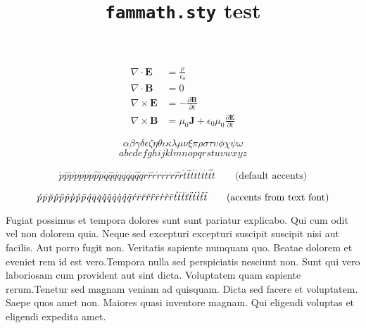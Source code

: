 \documentclass{article}
\title{\texttt{fammath.sty} test}
\date{}
\begin{document}
  \maketitle

  \begin{align*}
    \nabla\cdot\mathbf{E} &= \frac{\rho}{\epsilon_0}\\
    \nabla\cdot\mathbf{B} &= 0\\
    \nabla\times\mathbf{E} &= -\frac{\partial\mathbf{B}}{\partial{t}}\\
    \nabla\times\mathbf{B} &= \mu_0\mathbf{J} + \epsilon_0\mu_0\frac{\partial\mathbf{E}}{\partial{t}}
  \end{align*}

  \begin{equation}
    \alpha \beta \gamma \delta \epsilon \zeta \eta \theta \iota \kappa \lambda \mu \nu \xi \pi \rho \sigma \tau \upsilon \phi \chi \psi \omega
  \end{equation}
  \begin{equation}
    abcdefghijklmnopqrstuvwxyz
  \end{equation}

  \begin{equation}
  \acute{p}
  \bar{p}
  \breve{p}
  \check{p}
  \ddot{p}
  \dot{p}
  \grave{p}
  \hat{p}
  \tilde{p}
  \acute{q}
  \bar{q}
  \breve{q}
  \check{q}
  \ddot{q}
  \dot{q}
  \grave{q}
  \hat{q}
  \tilde{q}
  \acute{r}
  \bar{r}
  \breve{r}
  \check{r}
  \ddot{r}
  \dot{r}
  \grave{r}
  \hat{r}
  \tilde{r}
  \acute{t}
  \bar{t}
  \breve{t}
  \check{t}
  \ddot{t}
  \dot{t}
  \grave{t}
  \hat{t}
  \tilde{t}
  \qquad{\text{(default accents)}}
  \end{equation}

  \begin{equation}
  \sacute{p}
  \sbar{p}
  \sbreve{p}
  \scheck{p}
  \sddot{p}
  \sdot{p}
  \sgrave{p}
  \shat{p}
  \stilde{p}
  \sacute{q}
  \sbar{q}
  \sbreve{q}
  \scheck{q}
  \sddot{q}
  \sdot{q}
  \sgrave{q}
  \shat{q}
  \stilde{q}
  \sacute{r}
  \sbar{r}
  \sbreve{r}
  \scheck{r}
  \sddot{r}
  \sdot{r}
  \sgrave{r}
  \shat{r}
  \stilde{r}
  \sacute{t}
  \sbar{t}
  \sbreve{t}
  \scheck{t}
  \sddot{t}
  \sdot{t}
  \sgrave{t}
  \shat{t}
  \stilde{t}
  \qquad{\text{(accents from text font)}}
  \end{equation}

  \textsf{Fugiat possimus et tempora dolores sunt sunt pariatur explicabo. Qui cum odit vel non dolorem quia. Neque sed excepturi excepturi suscipit suscipit nisi aut facilis. Aut porro fugit non. Veritatis sapiente numquam quo. Beatae dolorem et eveniet rem id est vero.Tempora nulla sed perspiciatis nesciunt non. Sunt qui vero laboriosam cum provident aut sint dicta. Voluptatem quam sapiente rerum.Tenetur sed magnam veniam ad quisquam. Dicta sed facere et voluptatem. Saepe quos amet non. Maiores quasi inventore magnam. Qui eligendi voluptas et eligendi expedita amet.}
\end{document}
